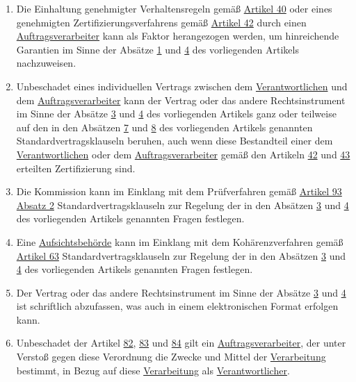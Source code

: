 \begin{enumerate}
  \item Die Einhaltung genehmigter Verhaltensregeln gemäß \hyperref[ch:40]{Artikel 40} oder eines genehmigten
   Zertifizierungsverfahrens gemäß \hyperref[ch:42]{Artikel 42} durch einen \hyperref[itm:04-8]
   {Auftragsverarbeiter} kann als Faktor herangezogen werden, um hinreichende Garantien im Sinne der Absätze \hyperref
   [itm:28-1]{1} und \hyperref[itm:28-4]{4} des vorliegenden Artikels nachzuweisen.%
  \label{itm:28-5}

  \item Unbeschadet eines individuellen Vertrags zwischen dem \hyperref[itm:04-7]{Verantwortlichen} und dem \hyperref
   [itm:04-8]{Auftragsverarbeiter} kann der Vertrag oder das andere Rechtsinstrument im Sinne der Absätze \hyperref
   [itm:28-3-1]{3} und \hyperref[itm:28-4]{4} des vorliegenden Artikels ganz oder teilweise auf den in den
   Absätzen \hyperref[itm:28-7]{7} und \hyperref[itm:28-8]{8} des vorliegenden Artikels genannten
   Standardvertragsklauseln beruhen, auch wenn diese Bestandteil einer dem
   \hyperref[itm:04-7]{Verantwortlichen} oder dem \hyperref[itm:04-8]{Auftragsverarbeiter} gemäß den Artikeln \hyperref
    [ch:42]{42} und \hyperref[ch:43]{43} erteilten Zertifizierung sind.%
  \label{itm:28-6}

  \item Die Kommission kann im Einklang mit dem Prüfverfahren gemäß \hyperref[itm:93-2]{Artikel 93
   Absatz 2} Standardvertragsklauseln zur Regelung der in den Absätzen \hyperref[itm:28-3-1]{3} und \hyperref[itm:28-4]
   {4} des vorliegenden Artikels genannten Fragen festlegen.%
  \label{itm:28-7}

  \item Eine \hyperref[itm:04-21]{Aufsichtsbehörde} kann im Einklang mit dem Kohärenzverfahren gemäß \hyperref[ch:63]
   {Artikel 63} Standardvertragsklauseln zur Regelung der in den Absätzen \hyperref[itm:28-3-1]{3} und \hyperref
   [itm:28-4]{4} des vorliegenden Artikels genannten Fragen festlegen.%
  \label{itm:28-8}

  \item Der Vertrag oder das andere Rechtsinstrument im Sinne der Absätze \hyperref[itm:28-3-1]{3} und \hyperref
   [itm:28-4]{4} ist schriftlich abzufassen, was auch in einem elektronischen Format erfolgen kann.%
  \label{itm:28-9}

  \item Unbeschadet der Artikel \hyperref[ch:82]{82}, \hyperref[ch:83]{83} und \hyperref[ch:84]{84} gilt ein
   \hyperref[itm:04-8]{Auftragsverarbeiter}, der unter Verstoß gegen diese Verordnung die Zwecke und Mittel
    der \hyperref[itm:04-2]{Verarbeitung} bestimmt, in Bezug auf diese \hyperref[itm:04-2]{Verarbeitung} als \hyperref
    [itm:04-7]{Verantwortlicher}.%
  \label{itm:28-10}

\end{enumerate}



